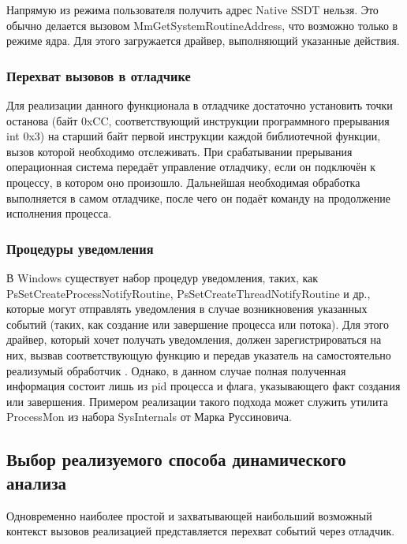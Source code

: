 Напрямую из режима пользователя получить адрес Native SSDT нельзя. Это обычно делается вызовом MmGetSystemRoutineAddress, что возможно только в режиме ядра. Для этого загружается драйвер, выполняющий указанные действия.
\subsubsection {Перехват вызовов в отладчике}
Для реализации данного функционала в отладчике достаточно установить точки останова (байт 0xCC, соответствующий инструкции программного прерывания int 0x3) на старший байт первой инструкции каждой библиотечной функции, вызов которой необходимо отслеживать. При срабатывании прерывания операционная система передаёт управление отладчику, если он подключён к процессу, в котором оно произошло. Дальнейшая необходимая обработка выполняется в самом отладчике, после чего он подаёт команду на продолжение исполнения процесса.
\subsubsection {Процедуры уведомления}
В Windows существует набор процедур уведомления, таких, как PsSetCreateProcessNotifyRoutine, PsSetCreateThreadNotifyRoutine и др., которые могут отправлять уведомления в случае возникновения указанных событий (таких, как создание или завершение процесса или потока). Для этого драйвер, который хочет получать уведомления, должен зарегистрироваться на них, вызвав соответствующую функцию и передав указатель на самостоятельно реализумый обработчик . Однако, в данном случае полная полученная информация состоит лишь из pid процесса и флага, указывающего факт создания или завершения. Примером реализации такого подхода может служить утилита ProcessMon из набора SysInternals от Марка Руссиновича.
\subsection {Выбор реализуемого способа динамического анализа}
Одновременно наиболее простой и захватывающей наибольший возможный контекст вызовов реализацией представляется перехват событий через отладчик.

